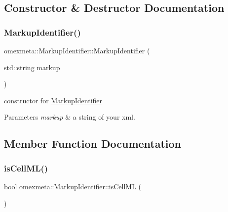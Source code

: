 \subsection{Constructor \& Destructor Documentation}
\mbox{\label{classomexmeta_1_1MarkupIdentifier_a0bb73ce6d5c94efcd97471059a378058}} 
\subsubsection{\texorpdfstring{Markup\+Identifier()}{MarkupIdentifier()}}
{\footnotesize\ttfamily omexmeta\+::\+Markup\+Identifier\+::\+Markup\+Identifier (\begin{DoxyParamCaption}\item[{std\+::string}]{markup }\end{DoxyParamCaption})\hspace{0.3cm}{\ttfamily [explicit]}}



constructor for \hyperlink{classomexmeta_1_1MarkupIdentifier}{Markup\+Identifier} 


\begin{DoxyParams}{Parameters}
{\em markup} & a string of your xml. \\
\hline
\end{DoxyParams}


\subsection{Member Function Documentation}
\mbox{\label{classomexmeta_1_1MarkupIdentifier_a2fd631a49a8a3d06e668cdbf130d5cb3}} 
\subsubsection{\texorpdfstring{is\+Cell\+M\+L()}{isCellML()}}
{\footnotesize\ttfamily bool omexmeta\+::\+Markup\+Identifier\+::is\+Cell\+ML (\begin{DoxyParamCaption}{ }\end{DoxyParamCaption})}



